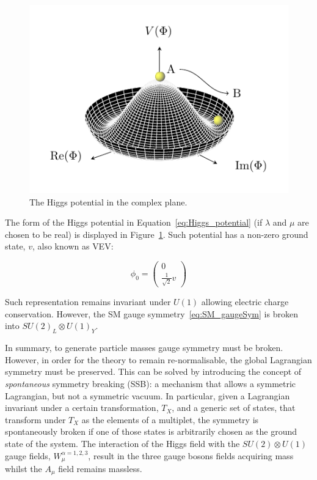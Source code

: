 			\begin{figure}
				\centering
				\includegraphics[width=.4\textwidth]{HiggsPotential/HiggsPotential}
				\caption{\label{fig:higgs_potential}The Higgs potential in the complex plane.} %
			\end{figure}

			The form of the Higgs potential in Equation~\ref{eq:Higgs_potential} (if $\lambda$ and $\mu$ are chosen to be real) is displayed in Figure~\ref{fig:higgs_potential}. Such potential has a non-zero ground state, $v$, also known as \ac{VEV}:

			\begin{equation}
			\label{eq:Higgs_vev}
				\phi_0 = 
				\begin{pmatrix}
					0 \\ \frac{1}{\sqrt{2}} v
				\end{pmatrix}
			\end{equation}

			\noindent Such representation remains invariant under $U(1)$ allowing electric charge conservation. However, the \ac{SM} gauge symmetry~\ref{eq:SM_gaugeSym} is broken into $SU(2)_L \otimes U(1)_Y$.

			In summary, to generate particle masses gauge symmetry must be broken. However, in order for the theory to remain re-normalisable, the global Lagrangian symmetry must be preserved. This can be solved by introducing the concept of \emph{spontaneous} symmetry breaking (SSB): a mechanism that allows a symmetric Lagrangian, but not a symmetric vacuum. In particular, given a Lagrangian invariant under a certain transformation, $T_X$, and a generic set of states, that transform under $T_X$ as the elements of a multiplet, the symmetry is spontaneously broken if one of those states is arbitrarily chosen as the ground state of the system. 
			The interaction of the Higgs field with the $SU(2) \otimes U(1)$ gauge fields, $W_\mu^{\alpha =1,2,3}$, result in the three gauge bosons fields acquiring mass whilst the $A_\mu$ field remains massless. 




